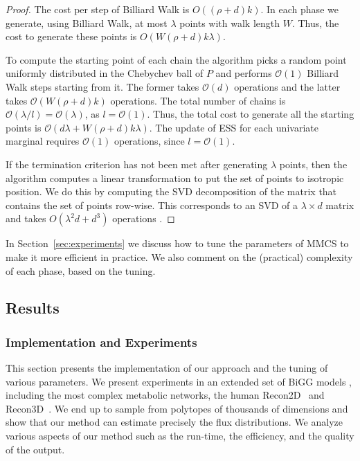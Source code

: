    \begin{proof}
       The cost per step of Billiard Walk is $O((\rho + d)k)$. In each phase we
       generate, using Billiard Walk, at most $\lambda$ points with walk length $W$.
       Thus, the cost to generate these points is $O(W(\rho + d)k\lambda)$.
     
        To compute the starting point of each chain the algorithm picks a random point
        uniformly distributed in the Chebychev ball of $P$ and performs $\mathcal{O}(1)$
        Billiard Walk steps starting from it.
        The former  takes $\mathcal{O}(d)$ operations and the latter  takes $\mathcal{O}(W(\rho + d)k)$ operations.
        The total number of chains is 
        $\mathcal{O}(\lambda / l) = \mathcal{O}(\lambda)$, 
        as $l=\mathcal{O}(1)$.
        Thus, the total cost to generate all the starting points is 
        $\mathcal{O}(d\lambda + W(\rho + d)k\lambda)$. 
        The update of ESS for each univariate marginal requires $\mathcal{O}(1)$ operations, 
        since $l = \mathcal{O}(1)$.
     
        If the termination criterion has not been met after generating $\lambda$ points,
        then the algorithm computes a linear transformation to put the set of points to isotropic position. 
        We do this by computing the SVD decomposition of the matrix that
        contains the set of points row-wise. This corresponds to an SVD of a
        $\lambda \times d$ matrix and takes $O(\lambda^2d + d^3)$ operations
        \cite{golub13}.
   \end{proof}

   In Section~\ref{sec:experiments} we discuss how to tune the parameters of MMCS
   to make it more efficient in practice. We also comment on the (practical)
   complexity of each phase, based on the tuning.



\subsection{Results}
\subsubsection*{Implementation and Experiments}
\label{sec:experiments}

   This section presents the implementation of our approach and the tuning of various parameters. 
   We present experiments in an extended set of BiGG models \cite{king2016bigg}, including the most complex metabolic networks, the human Recon2D~\cite{swainston16} and Recon3D~\cite{brunk2018recon3d}. 
   We end up to sample from polytopes of thousands of dimensions and show that our method can estimate precisely the flux distributions. 
   We analyze various aspects of our method such as the run-time, the efficiency, and the quality of the output.

